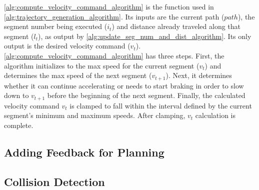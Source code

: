 \autoref{alg:compute_velocity_command_algorithm} is the \ComputeVelocityCommand function used in \autoref{alg:trajectory_generation_algorithm}. Its inputs are the current path ($path$), the segment number being executed ($i_t$) and distance already traveled along that segment ($l_t$), as output by \autoref{alg:update_seg_num_and_dist_algorithm}. Its only output is the desired velocity command ($v_t$). \autoref{alg:compute_velocity_command_algorithm} has three steps. First, the algorithm initializes to the max speed for the current segment ($v_t$) and determines the max speed of the next segment ($v_{t+1}$). Next, it determines whether it can continue accelerating or needs to start braking in order to slow down to $v_{t+1}$ before the beginning of the next segment. Finally, the calculated velocity command $v_t$ is clamped to fall within the interval defined by the current segment's minimum and maximum speeds. After clamping, $v_t$ calculation is complete.


\subsection{Adding Feedback for Planning}\label{subsec:trajectory_generation_actionlib}

\subsection{Collision Detection}\label{subsec:trajectory_generation_costmap3d}

\begin{comment}

\begin{enumerate}
\item talk about where the Lfollow feedback was used and how it impacted the performance
\item the math!
\item talk about improved interface thanks to actionlib and why that is important
\item octocostmap/costmap3d

\end{enumerate}

\end{comment}
